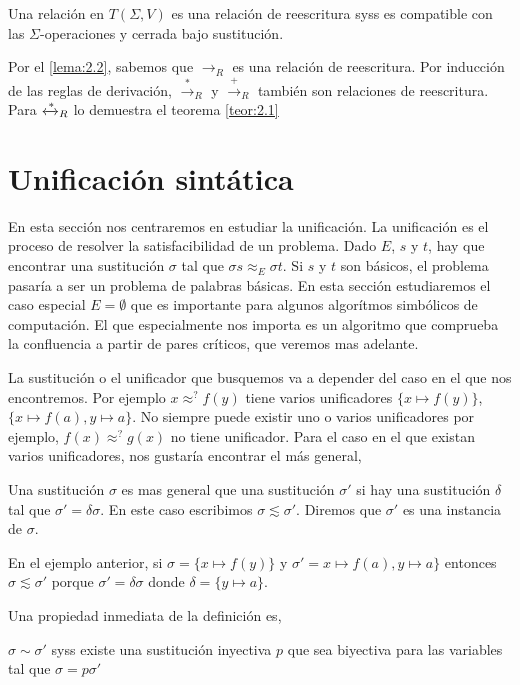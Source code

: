 \begin{defi}
  Una relación en $T(\Sigma, V)$ es una relación de reescritura syss
  es compatible con las $\Sigma$-operaciones y cerrada bajo
  sustitución.
\end{defi}

Por el \ref{lema:2.2}, sabemos que $\rightarrow_R$ es una relación de
reescritura. Por inducción de las reglas de derivación,
$\xrightarrow{*}_R$ y $\xrightarrow{+}_R$ también son relaciones de
reescritura. Para $\xleftrightarrow{*}_R$ lo demuestra el teorema \ref{teor:2.1}

\section{Unificación sintática}

En esta sección nos centraremos en estudiar la unificación. La
unificación es el proceso de resolver la satisfacibilidad de un
problema. Dado $E$, $s$ y $t$, hay que encontrar una sustitución
$\sigma$ tal que $\sigma s \approx _E \sigma t$. Si $s$ y $t$ son
básicos, el problema pasaría a ser un problema de palabras básicas. En
esta sección estudiaremos el caso especial $E = \emptyset$ que es
importante para algunos algorítmos simbólicos de computación. El que
especialmente nos importa es un algoritmo que comprueba la confluencia
a partir de pares críticos, que veremos mas adelante.

La sustitución o el unificador que busquemos va a
depender del caso en el que nos encontremos. Por ejemplo $x \approx^?
f(y)$ tiene varios unificadores $\{x \mapsto f(y) \}$, $\{x \mapsto
f(a), y \mapsto a\}$. No siempre puede existir uno o varios
unificadores por ejemplo, $f(x) \approx^? g(x)$ no tiene
unificador. Para el caso en el que existan varios unificadores, nos
gustaría encontrar el más general,

\begin{defi}
  Una sustitución $\sigma$ es mas general que una sustitución
  $\sigma'$ si hay una sustitución $\delta$ tal que $ \sigma' = \delta
  \sigma$. En este caso escribimos $\sigma \lesssim \sigma'$. Diremos
  que $\sigma'$ es una instancia de $\sigma$.
\end{defi}

En el ejemplo anterior, si $\sigma = \{x \mapsto f(y) \}$ y
$\sigma' = x \mapsto f(a), y \mapsto a\}$ entonces
$\sigma \lesssim \sigma'$ porque $\sigma' = \delta \sigma$ donde
$\delta = \{ y \mapsto a \}$.

Una propiedad inmediata de la definición es,
\begin{lema} \label{lema:3.1}
  $\sigma \sim \sigma '$ syss existe una sustitución inyectiva $p$ que
  sea biyectiva para las variables tal que $\sigma = p \sigma '$
\end{lema}

